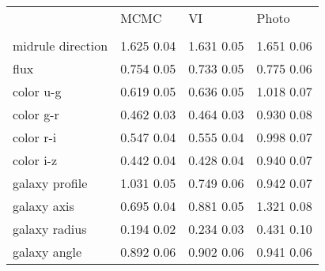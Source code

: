 \begin{tabular}{llll}
\toprule
{} &              MCMC &                VI &             Photo \\
\\midrule
direction    &  1.625 0.04 &  1.631 0.05 &  1.651 0.06 \\
flux   &  0.754 0.05 &  0.733 0.05 &  0.775 0.06 \\
color u-g    &  0.619 0.05 &  0.636 0.05 &  1.018 0.07 \\
color g-r    &  0.462 0.03 &  0.464 0.03 &  0.930 0.08 \\
color r-i    &  0.547 0.04 &  0.555 0.04 &  0.998 0.07 \\
color i-z    &  0.442 0.04 &  0.428 0.04 &  0.940 0.07 \\
galaxy profile      &  1.031 0.05 &  0.749 0.06 &  0.942 0.07 \\
galaxy axis         &  0.695 0.04 &  0.881 0.05 &  1.321 0.08 \\
galaxy radius       &  0.194 0.02 &  0.234 0.03 &  0.431 0.10 \\
galaxy angle        &  0.892 0.06 &  0.902 0.06 &  0.941 0.06 \\
\bottomrule
\end{tabular}
